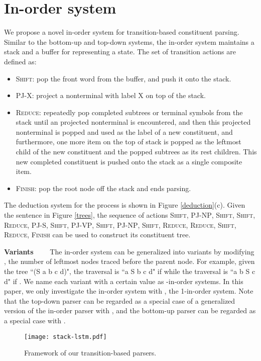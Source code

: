 \documentclass[11pt,letterpaper]{article}
\begin{document}
\section{In-order system}
We propose a novel in-order system for transition-based constituent parsing.
Similar to the bottom-up and top-down systems, the in-order system maintains a stack and a buffer for representing a state.
The set of transition actions are defined as:
\begin{itemize}
\item \textsc{Shift}: pop the front word from the buffer, and push it onto the stack.
\item \textsc{PJ-X}: project a nonterminal with label X on top of the stack.
\item \textsc{Reduce}: repeatedly pop completed subtrees or terminal symbols from the stack until an projected nonterminal is encountered, and then this projected nonterminal is popped and used as the label of a new constituent, and furthermore, one more item on the top of stack is popped as the leftmost child of the new constituent and the popped subtrees as its rest children. This new completed constituent is pushed onto the stack as a single composite item.
\item \textsc{Finish}: pop the root node off the stack and ends parsing.
\end{itemize}
The deduction system for the process is shown in Figure \ref{deduction}(c).
Given the sentence in Figure \ref{trees}, the sequence of actions \textsc{Shift}, \textsc{PJ-NP}, \textsc{Shift}, \textsc{Shift}, \textsc{Reduce}, \textsc{PJ-S}, \textsc{Shift}, \textsc{PJ-VP}, \textsc{Shift}, \textsc{PJ-NP}, \textsc{Shift}, \textsc{Reduce}, \textsc{Reduce}, \textsc{Shift}, \textsc{Reduce}, \textsc{Finish} can be used to construct its constituent tree.

\textbf{Variants}~~~~
The in-order system can be generalized into variants by modifying , the number of leftmost nodes traced before the parent node.
For example, given the tree ``(S a b c d)", the traversal is ``a S b c d" if  while the traversal is ``a b S c d" if .
We name each variant with a certain  value as -in-order systems.
In this paper, we only investigate the in-order system with , the 1-in-order system.
Note that the top-down parser can be regarded as a special case of a generalized version of the in-order parser with , and the bottom-up parser can be regarded as a special case with .
\begin{figure}
\begin{center}
\texttt{[image: stack-lstm.pdf]}
\end{center}
\caption{\label{stacklstm} Framework of our transition-based parsers.}
\end{figure}
\end{document}
